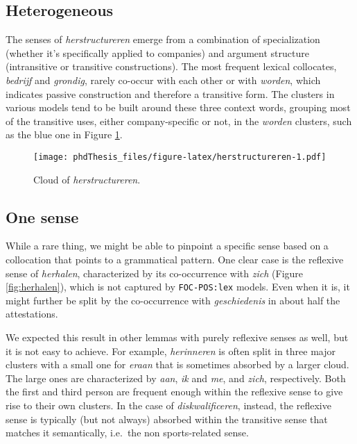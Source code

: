 \documentclass[
]{book}
\begin{document}
\hypertarget{heterogeneous}{%
\subsection{Heterogeneous}\label{heterogeneous}}

The senses of \emph{herstructureren} emerge from a combination of specialization (whether it's specifically applied to companies) and argument structure (intransitive or transitive constructions). The most frequent lexical collocates, \emph{bedrijf} and \emph{grondig}, rarely co-occur with each other or with \emph{worden}, which indicates passive construction and therefore a transitive form. The clusters in various models tend to be built around these three context words, grouping most of the transitive uses, either company-specific or not, in the \emph{worden} clusters, such as the blue one in Figure \ref{fig:herstructureren}.



\begin{figure}
\centering
\texttt{[image: phdThesis\_files/figure-latex/herstructureren-1.pdf]}
\caption{\label{fig:herstructureren}Cloud of \emph{herstructureren}.}
\end{figure}

\hypertarget{one-sense-1}{%
\subsection{One sense}\label{one-sense-1}}

While a rare thing, we might be able to pinpoint a specific sense based on a collocation that points to a grammatical pattern. One clear case is the reflexive sense of \emph{herhalen}, characterized by its co-occurrence with \emph{zich} (Figure \ref{fig:herhalen}), which is not captured by \texttt{FOC-POS:lex} models. Even when it is, it might further be split by the co-occurrence with \emph{geschiedenis} in about half the attestations.

We expected this result in other lemmas with purely reflexive senses as well, but it is not easy to achieve. For example, \emph{herinneren} is often split in three major clusters with a small one for \emph{eraan} that is sometimes absorbed by a larger cloud. The large ones are characterized by \emph{aan}, \emph{ik} and \emph{me}, and \emph{zich}, respectively. Both the first and third person are frequent enough within the reflexive sense to give rise to their own clusters. In the case of \emph{diskwalificeren}, instead, the reflexive sense is typically (but not always) absorbed within the transitive sense that matches it semantically, i.e.~the non sports-related sense.
\end{document}

